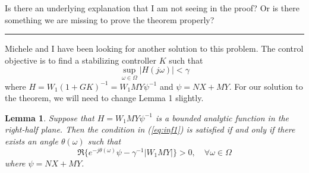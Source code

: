 \documentclass[12pt]{article}
\newtheorem{lemma}{Lemma}
\begin{document}
Is there an underlying explanation that I am not seeing in the proof? Or is there something we are missing to prove the theorem properly?
\vspace{0.2cm} \hrule 

Michele and I have been looking for another solution to this problem. The control objective is to find a stabilizing controller $K$ such that
\begin{equation} \label{eq:inf1}
\sup_{\omega \in \Omega} |H(j\omega)| < \gamma
\end{equation}
where $H = W_1(1+GK)^{-1} = W_1MY\psi^{-1}$ and $\psi = NX+MY$. For our solution to the theorem, we will need to change Lemma 1 slightly. 
\begin{lemma} 
Suppose that $H = W_1 MY\psi^{-1}$ is a bounded analytic function in the right-half plane. Then the condition in (\ref{eq:inf1}) is satisfied if and only if there exists an angle $\theta(\omega)$ such that
\begin{equation} \label{eq:lem_mod}
\Re \{ e^{-j\theta(\omega)}\psi - \gamma^{-1}|W_1MY|\}>0 , \quad \forall \omega \in \Omega
\end{equation}
where $\psi = NX+MY$.
\end{lemma}
\end{document}
